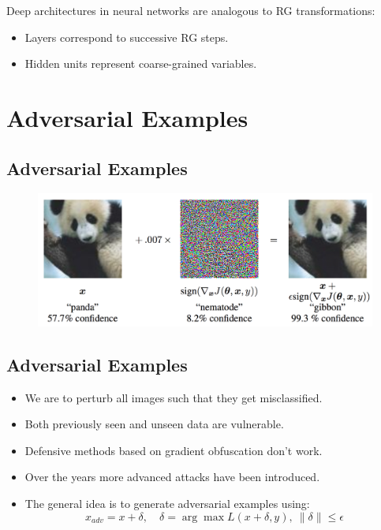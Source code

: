 \documentclass{antclass}
\begin{document}
Deep architectures in neural networks are analogous to RG transformations:
\begin{itemize}
\item Layers correspond to successive RG steps.
\item Hidden units represent coarse-grained variables.
\end{itemize}

\pagebreak

\chapter{Adversarial Examples}

\section{Adversarial Examples}
\begin{figure}
	\centering
	\includegraphics[width=0.8\linewidth]{pics/fgsm_panda_image.png}
	\label{fig:panda}
\end{figure}

\section{Adversarial Examples}
\begin{itemize}
	\item We are to perturb all images such that they get misclassified.
	\item Both previously seen and unseen data are vulnerable.
	\item Defensive methods based on gradient obfuscation don't work.
	\item Over the years more advanced attacks have been introduced.
	\item The general idea is to generate adversarial examples using:
	$$x_{adv} = x + \delta , \quad \delta = \arg \max L(x+\delta , y), ~\|\delta \| \le \epsilon$$
\end{itemize}
\end{document}
